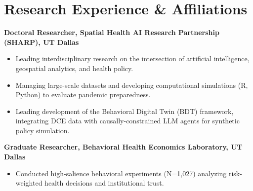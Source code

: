 \documentclass[11pt, letterpaper]{article}
\begin{document}

\section*{Research Experience \& Affiliations}
\textbf{Doctoral Researcher, Spatial Health AI Research Partnership (SHARP), UT Dallas} \\
\begin{itemize}[noitemsep, topsep=0pt, label={-}]
    \item Leading interdisciplinary research on the intersection of artificial intelligence, geospatial analytics, and health policy.
    \item Managing large-scale datasets and developing computational simulations (R, Python) to evaluate pandemic preparedness.
    \item Leading development of the Behavioral Digital Twin (BDT) framework, integrating DCE data with causally-constrained LLM agents for synthetic policy simulation.
\end{itemize}

\vspace{0.5em}
\noindent \textbf{Graduate Researcher, Behavioral Health Economics Laboratory, UT Dallas} \\
\begin{itemize}[noitemsep, topsep=0pt, label={-}]
    \item Conducted high-salience behavioral experiments (N=1,027) analyzing risk-weighted health decisions and institutional trust.
\end{itemize}
\end{document}
